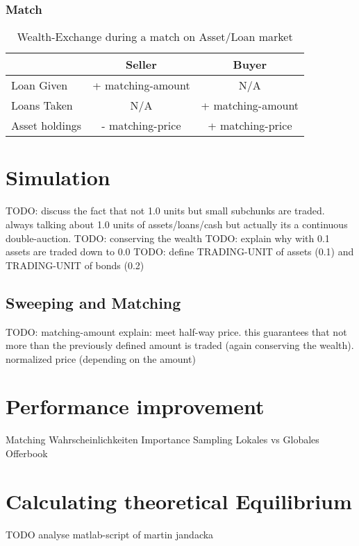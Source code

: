 \documentclass[Bachelorarbeit.tex]{subfiles}
\begin{document}
\subsubsection{Match}

\begin{table}[H]
	\centering
	\caption{Wealth-Exchange during a match on Asset/Loan market}
	\begin{tabular} { l c c }
		& Seller & Buyer \\
		\hline
		Loan Given & + matching-amount & N/A \\
		Loans Taken & N/A & + matching-amount \\
		Asset holdings & - matching-price & + matching-price \\
		\hline
	\end{tabular}
\end{table}

\section{Simulation}
TODO: discuss the fact that not 1.0 units but small subchunks are traded. always talking about 1.0 units of assets/loans/cash but actually its a continuous double-auction.
TODO: conserving the wealth
TODO: explain why with 0.1 assets are traded down to 0.0
TODO: define TRADING-UNIT of assets (0.1) and TRADING-UNIT of bonds (0.2)

\subsection{Sweeping and Matching}
TODO: matching-amount explain: meet half-way price. this guarantees that not more than the previously defined amount is traded (again conserving the wealth). normalized price (depending on the amount)

\label{sec:implementation_sweepingAndMatching}

\section{Performance improvement}
\label{sec:implementation_performanceImprovement}
Matching Wahrscheinlichkeiten
Importance Sampling
Lokales vs Globales Offerbook

\section{Calculating theoretical Equilibrium}
TODO analyse matlab-script of martin jandacka
\end{document}
